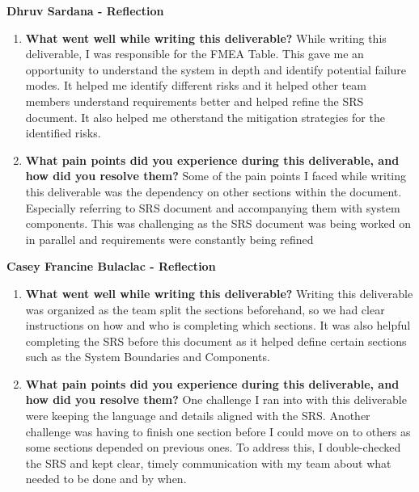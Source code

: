 \documentclass{article}
\begin{document}
\textbf{Dhruv Sardana  - Reflection}
\begin{enumerate}
  \item \textbf{What went well while writing this deliverable?}\newline
    While writing this deliverable, I was responsible for the FMEA Table. This gave me an opportunity to 
    understand the system in depth and identify potential failure modes. It helped me identify different risks and 
    it helped other team members understand requirements better and helped refine the SRS document. 
    It also helped me otherstand the mitigation strategies for the identified risks.

  \item \textbf{What pain points did you experience during this
    deliverable, and how did you resolve them?}\newline
    Some of the pain points I faced while writing this deliverable was the dependency on other sections within the document.
    Especially referring to SRS document and accompanying them with system components. 
    This was challenging as the SRS document was being worked on in parallel and requirements were constantly being refined
\end{enumerate}

\textbf{Casey Francine Bulaclac - Reflection}
\begin{enumerate}
    \item \textbf{What went well while writing this deliverable? }
    Writing this deliverable was organized as the team split the sections beforehand, so we had clear instructions on how and who is completing which sections. It 
    was also helpful completing the SRS before this document as it helped define certain sections such as the System Boundaries and Components. 

    \item \textbf{What pain points did you experience during this deliverable, and how
    did you resolve them?}
    One challenge I ran into with this deliverable were keeping the language and details aligned with the SRS. Another challenge was having to finish one section before I could move on 
    to others as some sections depended on previous ones. To address this, I double-checked the SRS and kept clear, timely communication with my team about what needed to be done and by when.
\end{enumerate}
\end{document}

